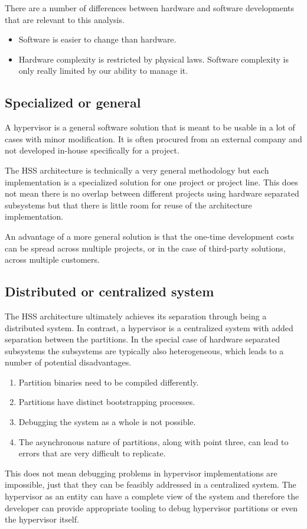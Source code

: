 There are a number of differences between hardware and software developments that are relevant to this analysis. 
\begin{itemize}
\item Software is easier to change than hardware. 
\item Hardware complexity is restricted by physical laws. Software complexity is only really limited by our ability to manage it.
\end{itemize}
\subsection{Specialized or general}
A hypervisor is a general software solution that is meant to be usable in a lot of cases with minor modification. It is often procured from an external company and not developed in-house specifically for a project.

The \gls{HSS} architecture is technically a very general methodology but each implementation is a specialized solution for one project or project line. This does not mean there is no overlap between different projects using hardware separated subsystems but that there is little room for reuse of the architecture implementation.

An advantage of a more general solution is that the one-time development costs can be spread across multiple projects, or in the case of third-party solutions, across multiple customers.   

\subsection{Distributed or centralized system} \label{distributed-or-centralized}
The \gls{HSS} architecture ultimately achieves its separation through being a distributed system. In contrast, a hypervisor is a centralized system with added separation between the partitions. In the special case of hardware separated subsystems the subsystems are typically also heterogeneous, which leads to a number of potential disadvantages.
\begin{enumerate}
\item Partition binaries need to be compiled differently.
\item Partitions have distinct bootstrapping processes.
\item Debugging the system as a whole is not possible.
\item The asynchronous nature of partitions, along with point three, can lead to errors that are very difficult to replicate.
\end{enumerate}
This does not mean debugging problems in hypervisor implementations are impossible, just that they can be feasibly addressed in a centralized system. The hypervisor as an entity can have a complete view of the system and therefore the developer can provide appropriate tooling to debug hypervisor partitions or even the hypervisor itself.

